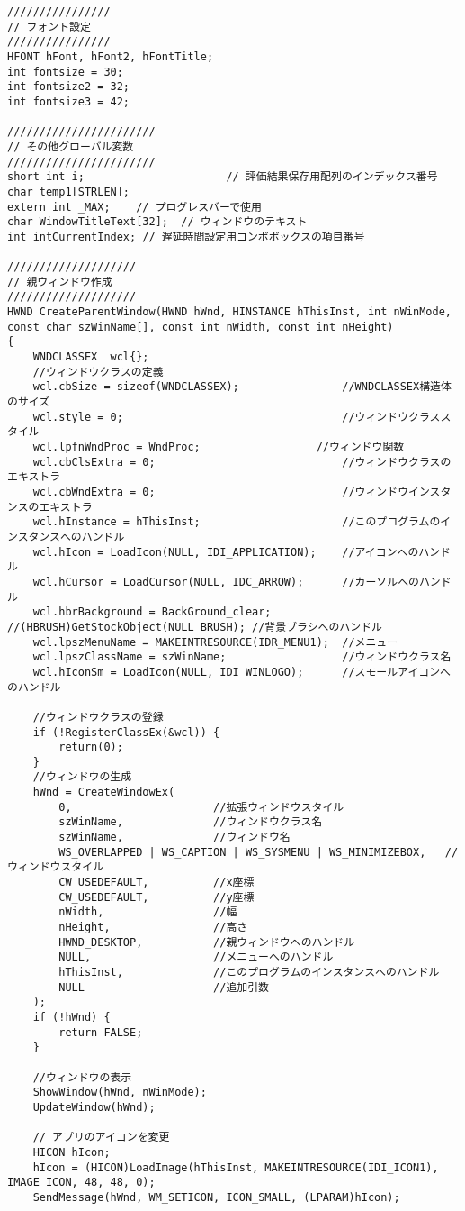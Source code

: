 \begin{lstlisting}[caption=window.cpp]
////////////////
// フォント設定
////////////////
HFONT hFont, hFont2, hFontTitle;       
int fontsize = 30;  
int fontsize2 = 32;
int fontsize3 = 42;

///////////////////////
// その他グローバル変数
///////////////////////
short int i;                      // 評価結果保存用配列のインデックス番号
char temp1[STRLEN];
extern int _MAX;    // プログレスバーで使用
char WindowTitleText[32];  // ウィンドウのテキスト
int intCurrentIndex; // 遅延時間設定用コンボボックスの項目番号

////////////////////
// 親ウィンドウ作成
////////////////////
HWND CreateParentWindow(HWND hWnd, HINSTANCE hThisInst, int nWinMode, const char szWinName[], const int nWidth, const int nHeight)
{
	WNDCLASSEX	wcl{};
	//ウィンドウクラスの定義
	wcl.cbSize = sizeof(WNDCLASSEX);				//WNDCLASSEX構造体のサイズ
	wcl.style = 0;									//ウィンドウクラススタイル
	wcl.lpfnWndProc = WndProc;					//ウィンドウ関数
	wcl.cbClsExtra = 0;								//ウィンドウクラスのエキストラ
	wcl.cbWndExtra = 0;								//ウィンドウインスタンスのエキストラ
	wcl.hInstance = hThisInst;						//このプログラムのインスタンスへのハンドル
	wcl.hIcon = LoadIcon(NULL, IDI_APPLICATION);	//アイコンへのハンドル
	wcl.hCursor = LoadCursor(NULL, IDC_ARROW);		//カーソルへのハンドル
	wcl.hbrBackground = BackGround_clear;           //(HBRUSH)GetStockObject(NULL_BRUSH); //背景ブラシへのハンドル
	wcl.lpszMenuName = MAKEINTRESOURCE(IDR_MENU1);	//メニュー
	wcl.lpszClassName = szWinName;					//ウィンドウクラス名
	wcl.hIconSm = LoadIcon(NULL, IDI_WINLOGO);		//スモールアイコンへのハンドル

	//ウィンドウクラスの登録
	if (!RegisterClassEx(&wcl)) {
		return(0);
	}
	//ウィンドウの生成
	hWnd = CreateWindowEx(
		0,                      //拡張ウィンドウスタイル
		szWinName,				//ウィンドウクラス名
		szWinName,				//ウィンドウ名
		WS_OVERLAPPED | WS_CAPTION | WS_SYSMENU | WS_MINIMIZEBOX,	//ウィンドウスタイル
		CW_USEDEFAULT,			//x座標
		CW_USEDEFAULT,			//y座標
		nWidth,			        //幅
		nHeight,			    //高さ
		HWND_DESKTOP,			//親ウィンドウへのハンドル
		NULL,					//メニューへのハンドル
		hThisInst,				//このプログラムのインスタンスへのハンドル
		NULL					//追加引数
	);
	if (!hWnd) {
		return FALSE;
	}

	//ウィンドウの表示
	ShowWindow(hWnd, nWinMode);
	UpdateWindow(hWnd);

	// アプリのアイコンを変更
	HICON hIcon;
	hIcon = (HICON)LoadImage(hThisInst, MAKEINTRESOURCE(IDI_ICON1), IMAGE_ICON, 48, 48, 0);
	SendMessage(hWnd, WM_SETICON, ICON_SMALL, (LPARAM)hIcon);


\end{lstlisting}

